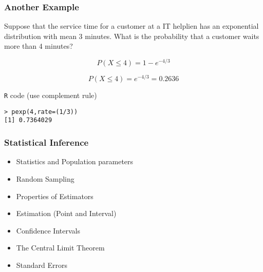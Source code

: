 \documentclass[a4]{beamer}
\begin{document}
\begin{frame}[fragile]
\Large
\frametitle{Another Example}
Suppose that the service time for a customer at a IT helplien
has an exponential distribution with mean 3 minutes. What is the probability that a
customer waits more than 4 minutes?

\[ P(X  \leq 4) = 1 -  e^{-4/3} \]

\[ P(X  \leq 4) = e^{-4/3} = 0.2636 \]


\texttt{R} code (use complement rule)
\begin{verbatim}
> pexp(4,rate=(1/3))
[1] 0.7364029
\end{verbatim}
\end{frame}



\begin{frame}
\frametitle{Statistical Inference}

\begin{itemize}
\item Statistics and Population parameters
\item Random Sampling
\item Properties of Estimators
\item Estimation (Point and Interval)
\item Confidence Intervals
\item The Central Limit Theorem
\item Standard Errors
\end{itemize}


\end{frame}


\end{document}
